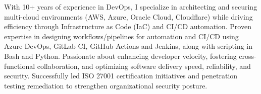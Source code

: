 

\begin{cvparagraph}

\end{cvparagraph}
With 10+ years of experience in DevOps, I specialize in architecting and securing multi-cloud environments (AWS, Azure, Oracle Cloud, Cloudflare) while driving efficiency through Infrastructure as Code (IaC) and CI/CD automation. Proven expertise in designing workflows/pipelines for automation and CI/CD using Azure DevOps, GitLab CI, GitHub Actions and Jenkins, along with scripting in Bash and Python. Passionate about enhancing developer velocity, fostering cross-functional collaboration, and optimizing software delivery speed, reliability, and security. Successfully led ISO 27001 certification initiatives and penetration testing remediation to strengthen organizational security posture.



